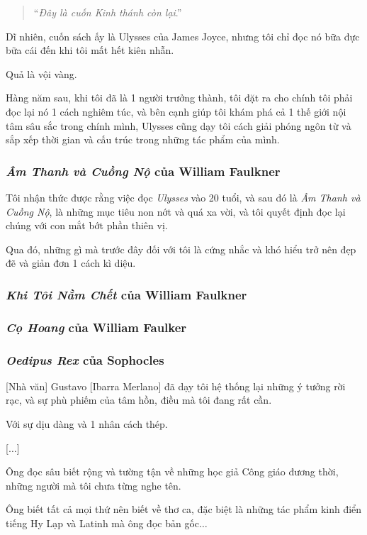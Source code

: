 \documentclass{article}
\begin{document}
\begin{quotation}
	``\textit{Đây là cuốn Kinh thánh còn lại}.''
\end{quotation}
Dĩ nhiên, cuốn sách ấy là Ulysses của James Joyce, nhưng tôi chỉ đọc nó bữa đực bữa cái đến khi tôi mất hết kiên nhẫn.

Quả là vội vàng.

Hàng năm sau, khi tôi đã là 1 người trưởng thành, tôi đặt ra cho chính tôi phải đọc lại nó 1 cách nghiêm túc, và bên cạnh giúp tôi khám phá cả 1 thế giới nội tâm sâu sắc trong chính mình, Ulysses cũng dạy tôi cách giải phóng ngôn từ và sắp xếp thời gian và cấu trúc trong những tác phẩm của mình.

\subsubsection{\textit{Âm Thanh và Cuồng Nộ} của William Faulkner}
Tôi nhận thức được rằng việc đọc \textit{Ulysses} vào 20 tuổi, và sau đó là \textit{Âm Thanh và Cuồng Nộ}, là những mục tiêu non nớt và quá xa vời, và tôi quyết định đọc lại chúng với con mắt bớt phần thiên vị.

Qua đó, những gì mà trước đây đối với tôi là cứng nhắc và khó hiểu trở nên đẹp đẽ và giản đơn 1 cách kì diệu.

\subsubsection{\textit{Khi Tôi Nằm Chết} của William Faulkner}

\subsubsection{\textit{Cọ Hoang} của William Faulker}

\subsubsection{\textit{Oedipus Rex} của Sophocles}
[Nhà văn] Gustavo [Ibarra Merlano] đã dạy tôi hệ thống lại những ý tưởng rời rạc, và sự phù phiếm của tâm hồn, điều mà tôi đang rất cần.

Với sự dịu dàng và 1 nhân cách thép.

[$\ldots$]

%
Ông đọc sâu biết rộng và tường tận về những học giả Công giáo đương thời, những người mà tôi chưa từng nghe tên.

Ông biết tất cả mọi thứ nên biết về thơ ca, đặc biệt là những tác phẩm kinh điển tiếng Hy Lạp và Latinh mà ông đọc bản gốc$\ldots$
\end{document}
